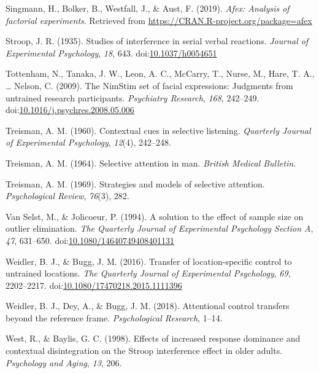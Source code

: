 \documentclass[english,,man,floatsintext]{apa6}
\begin{document}
\leavevmode\hypertarget{ref-r_afex_2019}{}%
Singmann, H., Bolker, B., Westfall, J., \& Aust, F. (2019). \emph{Afex: Analysis of factorial experiments}. Retrieved from \url{https://CRAN.R-project.org/package=afex}

\leavevmode\hypertarget{ref-stroop_studies_1935}{}%
Stroop, J. R. (1935). Studies of interference in serial verbal reactions. \emph{Journal of Experimental Psychology}, \emph{18}, 643. doi:\href{https://doi.org/10.1037/h0054651}{10.1037/h0054651}

\leavevmode\hypertarget{ref-tottenham_nimstim_2009}{}%
Tottenham, N., Tanaka, J. W., Leon, A. C., McCarry, T., Nurse, M., Hare, T. A., \ldots{} Nelson, C. (2009). The NimStim set of facial expressions: Judgments from untrained research participants. \emph{Psychiatry Research}, \emph{168}, 242--249. doi:\href{https://doi.org/10.1016/j.psychres.2008.05.006}{10.1016/j.psychres.2008.05.006}

\leavevmode\hypertarget{ref-treisman_contextual_1960}{}%
Treisman, A. M. (1960). Contextual cues in selective listening. \emph{Quarterly Journal of Experimental Psychology}, \emph{12}(4), 242--248.

\leavevmode\hypertarget{ref-treisman_selective_1964}{}%
Treisman, A. M. (1964). Selective attention in man. \emph{British Medical Bulletin}.

\leavevmode\hypertarget{ref-treisman_strategies_1969}{}%
Treisman, A. M. (1969). Strategies and models of selective attention. \emph{Psychological Review}, \emph{76}(3), 282.

\leavevmode\hypertarget{ref-van_selst_solution_1994}{}%
Van Selst, M., \& Jolicoeur, P. (1994). A solution to the effect of sample size on outlier elimination. \emph{The Quarterly Journal of Experimental Psychology Section A}, \emph{47}, 631--650. doi:\href{https://doi.org/10.1080/14640749408401131}{10.1080/14640749408401131}

\leavevmode\hypertarget{ref-weidler_transfer_2016}{}%
Weidler, B. J., \& Bugg, J. M. (2016). Transfer of location-specific control to untrained locations. \emph{The Quarterly Journal of Experimental Psychology}, \emph{69}, 2202--2217. doi:\href{https://doi.org/10.1080/17470218.2015.1111396}{10.1080/17470218.2015.1111396}

\leavevmode\hypertarget{ref-weidler_attentional_2018}{}%
Weidler, B. J., Dey, A., \& Bugg, J. M. (2018). Attentional control transfers beyond the reference frame. \emph{Psychological Research}, 1--14.

\leavevmode\hypertarget{ref-west_effects_1998}{}%
West, R., \& Baylis, G. C. (1998). Effects of increased response dominance and contextual disintegration on the Stroop interference effect in older adults. \emph{Psychology and Aging}, \emph{13}, 206.
\end{document}
